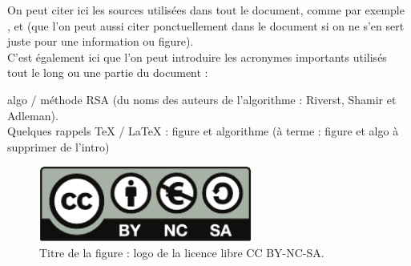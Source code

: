 \documentclass[a4paper,11pt]{article}
\begin{document}
On peut citer ici les sources utilisées dans tout le document, comme par exemple \cite{pixees}, et \cite{lewebpedagogique} (que l'on peut aussi citer ponctuellement dans le document si on ne s'en sert juste pour une information ou figure). %
\\ %
C'est également ici que l'on peut introduire les acronymes importants utilisés tout le long ou une partie du document :

algo / méthode RSA (du noms des auteurs de l'algorithme : Riverst, Shamir et Adleman).
\\
Quelques rappels TeX / LaTeX : figure et algorithme (à terme : figure et algo à supprimer de l'intro)
\begin{figure}[!h] %
\begin{center}
  \includegraphics[height=2.5cm]{by-nc-sa} %
  \caption{Titre de la figure : logo de la licence libre CC BY-NC-SA.}
  \label{fig1}
\end{center}
\end{figure}
\end{document}
